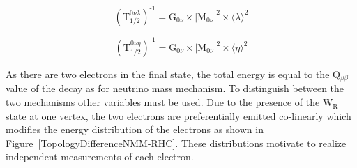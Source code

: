 \documentclass[main.tex]{subfiles}
\begin{document}
\begin{equation}
(\text{T}_{\text{1/2}}^{\text{0}\nu\lambda})^{\text{-1}} = \text{G}_{\text{0}\nu} \times |\text{M}_{\text{0}\nu}|^\text{2} \times \langle \lambda \rangle^\text{2}
\end{equation}

\begin{equation}
(\text{T}_{\text{1/2}}^{\text{0}\nu\eta})^{\text{-1}} = \text{G}_{\text{0}\nu} \times |\text{M}_{\text{0}\nu}|^\text{2} \times \langle \eta \rangle^\text{2}
\end{equation}


\bigskip


\NI As there are two electrons in the final state, the total energy is equal to the Q$_{\beta\beta}$ value of the decay as for neutrino mass mechanism. To distinguish between the two mechanisms other variables must be used. Due to the presence of the W$_\text{R}$ state at one vertex, the two electrons are preferentially emitted co-linearly which modifies the energy distribution of the electrons as shown in Figure~\ref{TopologyDifferenceNMM-RHC}. These distributions motivate to realize independent measurements of each electron. 
\end{document}
